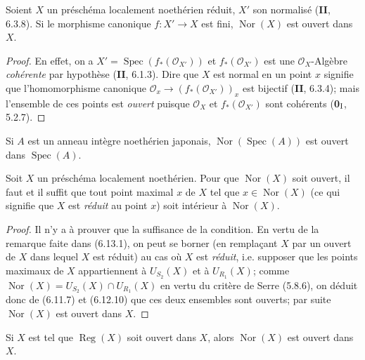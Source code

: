 \begin{proposition}[6.13.2]
\label{IV.2.s6.13.2-fr}
Soient $X$ un préschéma localement noethérien réduit, $X'$ son normalisé
\textup{(\textbf{II}, 6.3.8)}. Si le morphisme canonique $f:X'\to X$ est fini,
$\operatorname{Nor}(X)$ est ouvert dans $X$.
\end{proposition}

\begin{proof}
En effet, on a $X'=\operatorname{Spec}(f_*(\mathcal O_{X'}))$ et
$f_*(\mathcal O_{X'})$ est une $\mathcal O_X$-Algèbre \emph{cohérente} par
hypothèse (\textbf{II}, 6.1.3). Dire que $X$ est normal en un point $x$ signifie que
l'homomorphisme canonique
$\mathcal O_x\to(f_*(\mathcal O_{X'}))_x$ est bijectif (\textbf{II}, 6.3.4); mais
l'ensemble de ces points est \emph{ouvert} puisque $\mathcal O_X$ et
$f_*(\mathcal O_{X'})$ sont cohérents (\textbf{0}$_{\rm I}$, 5.2.7).
\end{proof}

\begin{corollary}[6.13.3]
\label{IV.2.s6.13.3-fr}
Si $A$ est un anneau intègre noethérien japonais,
$\operatorname{Nor}(\operatorname{Spec}(A))$ est ouvert dans
$\operatorname{Spec}(A)$.
\end{corollary}

\begin{proposition}[6.13.4]
\label{IV.2.s6.13.4-fr}
Soit $X$ un préschéma localement noethérien. Pour que
$\operatorname{Nor}(X)$ soit ouvert, il faut et il suffit que tout point
maximal $x$ de $X$ tel que $x\in\operatorname{Nor}(X)$ \textup{(ce qui signifie que
$X$ est \emph{réduit} au point $x$)} soit intérieur à $\operatorname{Nor}(X)$.
\end{proposition}

\begin{proof}
Il n'y a à prouver que la suffisance de la condition. En vertu de la
remarque faite dans (6.13.1), on peut se borner (en remplaçant $X$ par un
ouvert de $X$ dans lequel $X$ est réduit) au cas où $X$ est \emph{réduit}, i.e.
supposer que les points maximaux de $X$ appartiennent à $U_{S_2}(X)$ et à
$U_{R_1}(X)$; comme
$\operatorname{Nor}(X)=U_{S_2}(X)\cap U_{R_1}(X)$ en vertu du critère de
Serre (5.8.6), on déduit donc de (6.11.7) et (6.12.10) que ces deux ensembles
sont ouverts; par suite $\operatorname{Nor}(X)$ est ouvert dans $X$.
\end{proof}

\begin{corollary}[6.13.5]
\label{IV.2.s6.13.5-fr}
Si $X$ est tel que $\operatorname{Reg}(X)$ soit ouvert dans $X$, alors
$\operatorname{Nor}(X)$ est ouvert dans $X$.
\end{corollary}

